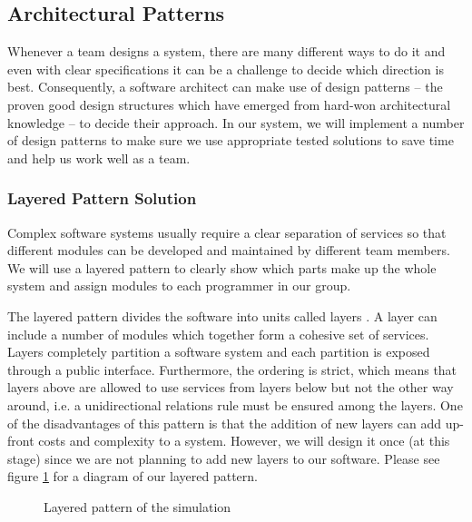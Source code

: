 \documentclass{article}
\begin{document}
\subsection{Architectural Patterns}
Whenever a team designs a system, there are many different ways to do it and even with clear specifications it can be a challenge to decide which direction is best. 
Consequently, a software architect can make use of design patterns -- the proven good design structures which have emerged from hard-won architectural knowledge \cite{bass2007software} -- to decide their approach. 
In our system, we will implement a number of design patterns to make sure we use appropriate tested solutions to save time and help us work well as a team. 


\subsubsection{Layered Pattern Solution}
Complex software systems usually require a clear separation of services so that different modules can be developed and maintained by different team members. 
We will use a layered pattern to clearly show which parts make up the whole system and assign modules to each programmer in our group. 


The layered pattern divides the software into units called layers \cite{bass2007software}. 
A layer can include a number of modules which together form a cohesive set of services. 
Layers completely partition a software system and each partition is exposed through a public interface. Furthermore, the ordering is strict, which means that layers above are allowed to use services from layers below but not the other way around, i.e. a unidirectional relations rule must be ensured among the layers. One of the disadvantages of this pattern is that the addition of new layers can add up-front costs and complexity to a system. 
However, we will design it once (at this stage) since we are not planning to add new layers to our software. Please see figure \ref{Layers} for a diagram of our layered pattern. 

\begin{figure}[H]
	\centering

	\caption{Layered pattern of the simulation}
		\label{Layers}
\end{figure}
\end{document}

